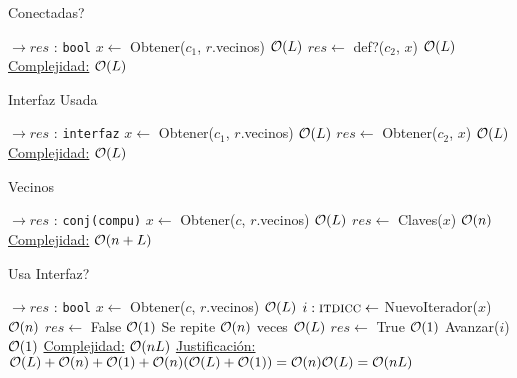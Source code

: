 \begin{Algoritmos}
\begin{algorithm}
\caption{Conectadas?}
\begin{algorithmic}[1]
    $\to res$ : \texttt{bool}
  \State $x \gets$ Obtener($c_1$, $r$.vecinos) \Comment $\mathcal{O}(L)$
  \State $res \gets$ def?($c_2$, $x$) \Comment $\mathcal{O}(L)$
 \EndProcedure
 \underline{Complejidad:} $\mathcal{O}(L)$
\end{algorithmic}
\end{algorithm}


\begin{algorithm}
\caption{Interfaz Usada}
\begin{algorithmic}[1]
   $\to res$ : \texttt{interfaz}
  \State $x \gets$ Obtener($c_1$, $r$.vecinos) \Comment $\mathcal{O}(L)$
  \State $res \gets$ Obtener($c_2$, $x$) \Comment $\mathcal{O}(L)$
 \EndProcedure
 \underline{Complejidad:} $\mathcal{O}(L)$
\end{algorithmic}
\end{algorithm}


\begin{algorithm}
\caption{Vecinos}
\begin{algorithmic}[1]
    $\to res$ : \texttt{conj(compu)}
  \State $x \gets$ Obtener($c$, $r$.vecinos) \Comment $\mathcal{O}(L)$
  \State $res \gets$ Claves($x$) \Comment $\mathcal{O}(n)$
 \EndProcedure
 \underline{Complejidad:} $\mathcal{O}(n+L)$
\end{algorithmic}
\end{algorithm}



\begin{algorithm}
\caption{Usa Interfaz?}
\begin{algorithmic}[1]
   $\to res$ : \texttt{bool} 
  \State $x \gets$ Obtener($c$, $r$.vecinos) \Comment $\mathcal{O}(L)$
  \State $i :\textsc{itdicc} \gets$ NuevoIterador($x$) \Comment $\mathcal{O}(n)$
  \State $res \gets$ False \Comment $\mathcal{O}(1)$
   \Comment Se repite $\mathcal{O}(n)$ veces
      \Comment $\mathcal{O}(L)$
       \State $res \gets$ True  \Comment $\mathcal{O}(1)$
    \EndIf
    \State Avanzar($i$) \Comment $\mathcal{O}(1)$
  \EndWhile
 \EndProcedure
 \underline{Complejidad:} $\mathcal{O}(nL)$
 \underline{Justificación:} $\mathcal{O}(L) + \mathcal{O}(n) + \mathcal{O}(1) + \mathcal{O}(n)(\mathcal{O}(L) + \mathcal{O}(1)) = \mathcal{O}(n)\mathcal{O}(L) = \mathcal{O}(nL)$
\end{algorithmic}
\end{algorithm}



\end{Algoritmos}
